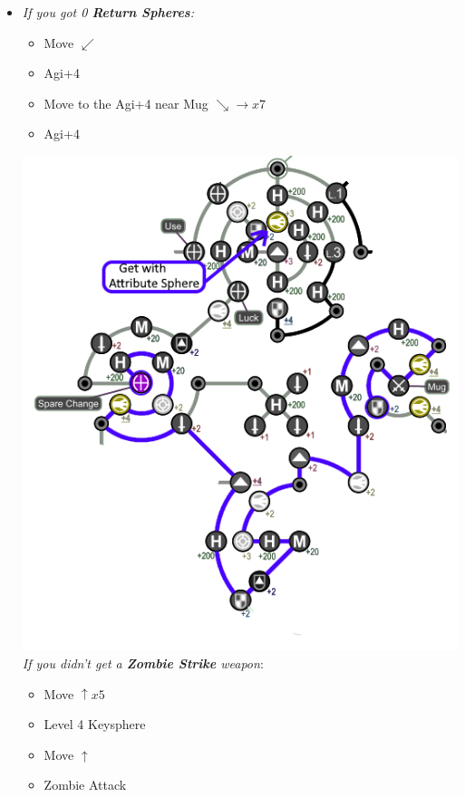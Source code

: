 \begin{spheregrid}
\begin{multicols}{2}
\begin{itemize}
            \item \textit{If you got 0 \textbf{Return Spheres}:}
            \begin{itemize}
                \yunaf Attribute Sphere \rikku's +3 Agi
                \item Move $\swarrow$
                \item Agi+4
                \item Move to the Agi+4 near Mug $\searrow\rightarrow x7$
                \item Agi+4
            \end{itemize}
            \includegraphics[width=.8\columnwidth]{graphics/0_return_before_BFA}
            \columnbreak
            \tidusf \textit{If you didn't get a \textbf{Zombie Strike} weapon}:
            \begin{itemize}
                \item Move $\uparrow x5$
                \item Level 4 Keysphere
                \item Move $\uparrow$
                \item Zombie Attack
            \end{itemize}

\end{itemize}
\end{multicols}
\end{spheregrid}
